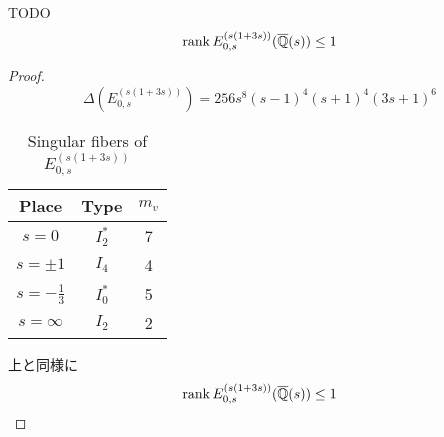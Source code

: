 \documentclass[main]{subfiles}
\begin{document}
\begin{thm}
    TODO
    \begin{equation}
        \operatorname{rank} E_{0,s}^{(s(1 + 3s))}(\overline{\mathbb{Q}}(s)) \leq 1
    \end{equation}
\end{thm}
\begin{proof}
    \begin{equation}
        \Delta(E_{0,s}^{(s(1 + 3s))}) = 256s^{8}(s - 1)^{4}(s + 1)^{4}(3s + 1)^{6}
    \end{equation}
    \begin{table}[h]
        \centering
        \caption{Singular fibers of $E_{0,s}^{(s(1 + 3s))}$}
        \begin{tabular}{|c|c|c|}
            \hline
            Place            & Type    & $m_v$ \\
            \hline
            $s=0$            & $I_2^*$ & 7     \\
            $s=\pm 1$        & $I_4$   & 4     \\
            $s=-\frac{1}{3}$ & $I_0^*$ & 5     \\
            $s=\infty$       & $I_2$   & 2     \\
            \hline
        \end{tabular}
    \end{table}
    上と同様に
    \begin{equation}
        \operatorname{rank} E_{0,s}^{(s(1 + 3s))}(\overline{\mathbb{Q}}(s)) \leq 1
    \end{equation}
\end{proof}
\end{document}
